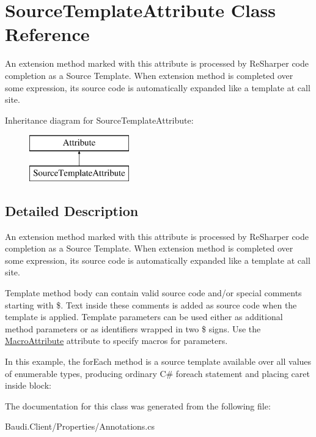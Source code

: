 \hypertarget{class_source_template_attribute}{}\section{Source\+Template\+Attribute Class Reference}
\label{class_source_template_attribute}


An extension method marked with this attribute is processed by Re\+Sharper code completion as a \textquotesingle{}Source Template\textquotesingle{}. When extension method is completed over some expression, it\textquotesingle{}s source code is automatically expanded like a template at call site.  


Inheritance diagram for Source\+Template\+Attribute\+:\begin{figure}[H]
\begin{center}
\leavevmode
\includegraphics[height=2.000000cm]{class_source_template_attribute}
\end{center}
\end{figure}


\subsection{Detailed Description}
An extension method marked with this attribute is processed by Re\+Sharper code completion as a \textquotesingle{}Source Template\textquotesingle{}. When extension method is completed over some expression, it\textquotesingle{}s source code is automatically expanded like a template at call site. 

Template method body can contain valid source code and/or special comments starting with \textquotesingle{}\$\textquotesingle{}. Text inside these comments is added as source code when the template is applied. Template parameters can be used either as additional method parameters or as identifiers wrapped in two \textquotesingle{}\$\textquotesingle{} signs. Use the \hyperlink{class_macro_attribute}{Macro\+Attribute} attribute to specify macros for parameters. 

In this example, the \textquotesingle{}for\+Each\textquotesingle{} method is a source template available over all values of enumerable types, producing ordinary C\# \textquotesingle{}foreach\textquotesingle{} statement and placing caret inside block\+: 
 

The documentation for this class was generated from the following file\+:\begin{DoxyCompactItemize}
\item 
Baudi.\+Client/\+Properties/Annotations.\+cs\end{DoxyCompactItemize}

